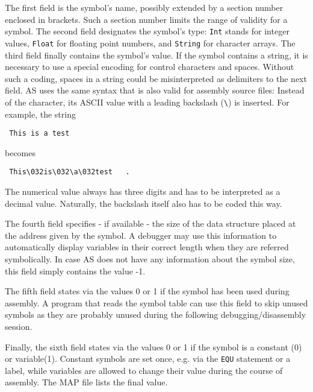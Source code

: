 \documentclass[12pt,twoside]{report}
\newcommand{\tty}[1]{{\tt #1}}
\begin{document}
The first field is the symbol's name, possibly extended by a section
number enclosed in brackets.  Such a section number limits the
range of validity for a symbol.  The second field designates the
symbol's type: \tty{Int} stands for integer values, \tty{Float} for floating
point numbers, and \tty{String} for character arrays.  The third field
finally contains the symbol's value.  If the symbol contains a
string, it is necessary to use a special encoding for control
characters and spaces.  Without such a coding, spaces in a string
could be misinterpreted as delimiters to the next field.  AS uses the
same syntax that is also valid for assembly source files: Instead of
the character, its ASCII value with a leading backslash (\verb!\!) is
inserted.  For example, the string
\begin{verbatim}
 This is a test
\end{verbatim}
becomes
\begin{verbatim}
 This\032is\032\a\032test   .
\end{verbatim}
The numerical value always has three digits and has to be interpreted
as a decimal value.  Naturally, the backslash itself also has to be
coded this way.

The fourth field specifies - if available - the size of the data
structure placed at the address given by the symbol.   A debugger may
use this information to automatically display variables in their
correct length when they are referred symbolically.  In case AS does
not have any information about the symbol size, this field simply
contains the value -1.

The fifth field states via the values 0 or 1 if the symbol has been
used during assembly.  A program that reads the symbol table can use
this field to skip unused symbols as they are probably unused during
the following debugging/disassembly session.

Finally, the sixth field states via the values 0 or 1 if the symbol
is a constant (0) or variable(1).  Constant symbols are set once, e.g.
via the \tty{EQU} statement or a label, while variables are allowed
to change their value during the course of assembly.  The MAP file
lists the final value.
\end{document}
